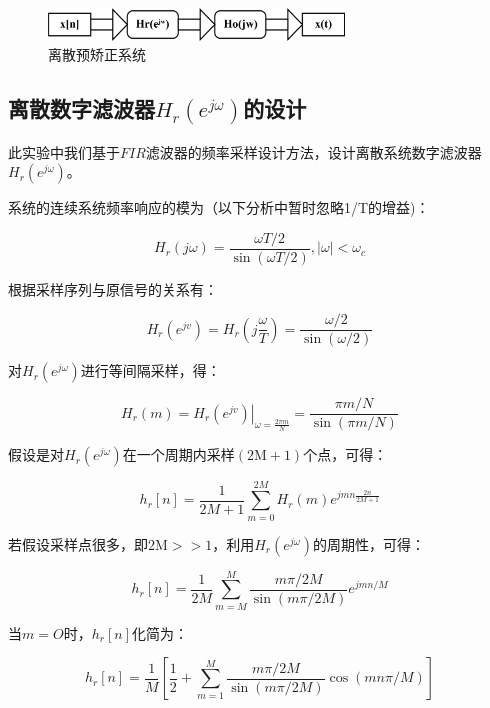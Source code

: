 \documentclass{../source/Experiment}
\begin{document}
            \begin{figure}[H]
                \centering
                \includegraphics[width = 0.7\textwidth]{pic/sys2.png}
                \caption{离散预矫正系统}
            \end{figure}

        \subsection{离散数字滤波器$H_{r}\left(e^{j \omega}\right)$的设计}
        
            此实验中我们基于$FIR$滤波器的频率采样设计方法，设计离散系统数字滤波器$H_{r}\left(e^{j \omega}\right)$。
            
            系统的连续系统频率响应的模为（以下分析中暂时忽略1/T的增益)：
            
            $$H_{r}(j \omega)=\frac{\omega T / 2}{\sin (\omega T / 2)},|\omega|<\omega_{c}$$
            
            根据采样序列与原信号的关系有：
            
            $$H_{r}\left(e^{j v}\right)=H_{r}\left(j \frac{\omega}{T}\right)=\frac{\omega / 2}{\sin (\omega / 2)}$$

            对$H_{r}\left(e^{j \omega}\right)$进行等间隔采样，得：
            
            $$H_{r}(m)=\left.H_{r}\left(e^{j v}\right)\right|_{\omega = \frac{2 \pi m}{N}}=\frac{\pi m / N}{\sin (\pi m / N)}$$
                    
            假设是对$H_{r}\left(e^{j \omega}\right)$在一个周期内采样$(2 \mathrm{M}+1)$个点，可得：
            
            $$h_{r}[n]=\frac{1}{2 M+1} \sum_{m=0}^{2 M} H_r(m) e^{j m n \frac{2 n}{2 M+1}}$$
            
            若假设采样点很多，即$2 \mathrm{M}>>1$，利用$H_r\left(e^{j \omega}\right)$的周期性，可得：
            
            $$h_{r}[n]=\frac{1}{2 M} \sum_{m=M}^{M} \frac{m \pi / 2 M}{\sin (m \pi / 2 M)} e^{j m n / M}$$
            
            当$m=O$时，$h_r[n]$化简为：
            
            $$h_{r}[n]=\frac{1}{M}\left[\frac{1}{2}+\sum_{m=1}^{M} \frac{m \pi / 2 M}{\sin (m \pi / 2 M)} \cos (m n \pi / M)\right]$$
            
\end{document}
